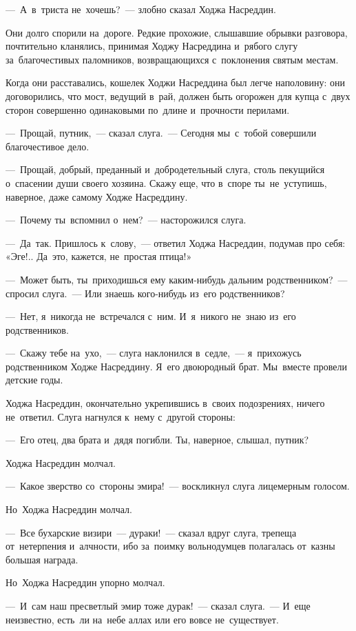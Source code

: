 \documentclass[12pt,a4paper]{book}
\begin{document}
—~А~в~триста не~хочешь?~— злобно сказал Ходжа Насреддин.

Они долго спорили на~дороге. Редкие прохожие, слышавшие обрывки разговора, почтительно кланялись, принимая Ходжу Насреддина и~рябого слугу за~благочестивых паломников, возвращающихся с~поклонения святым местам.

Когда они расставались, кошелек Ходжи Насреддина был легче наполовину: они договорились, что мост, ведущий в~рай, должен быть огорожен для купца с~двух сторон совершенно одинаковыми по~длине и~прочности перилами.

—~Прощай, путник,~— сказал слуга.~— Сегодня мы~с~тобой совершили благочестивое дело.

—~Прощай, добрый, преданный и~добродетельный слуга, столь пекущийся о~спасении души своего хозяина. Скажу еще, что в~споре ты~не~уступишь, наверное, даже самому Ходже Насреддину.

—~Почему ты~вспомнил о~нем?~— насторожился слуга.

—~Да~так. Пришлось к~слову,~— ответил Ходжа Насреддин, подумав про себя: «Эге!.. Да~это, кажется, не~простая птица!»

—~Может быть, ты~приходишься ему каким-нибудь дальним родственником?~— спросил слуга.~— Или знаешь кого-нибудь из~его родственников?

—~Нет, я~никогда не~встречался с~ним. И~я~никого не~знаю из~его родственников.

—~Скажу тебе на~ухо,~— слуга наклонился в~седле,~— я~прихожусь родственником Ходже Насреддину. Я~его двоюродный брат. Мы~вместе провели детские годы.

Ходжа Насреддин, окончательно укрепившись в~своих подозрениях, ничего не~ответил. Слуга нагнулся к~нему с~другой стороны:

—~Его отец, два брата и~дядя погибли. Ты, наверное, слышал, путник?

Ходжа Насреддин молчал.

—~Какое зверство со~стороны эмира!~— воскликнул слуга лицемерным голосом.

Но~Ходжа Насреддин молчал.

—~Все бухарские визири~— дураки!~— сказал вдруг слуга, трепеща от~нетерпения и~алчности, ибо за~поимку вольнодумцев полагалась от~казны большая награда.

Но~Ходжа Насреддин упорно молчал.

—~И~сам наш пресветлый эмир тоже дурак!~— сказал слуга.~— И~еще неизвестно, есть~ли на~небе аллах или его вовсе не~существует.
\end{document}
